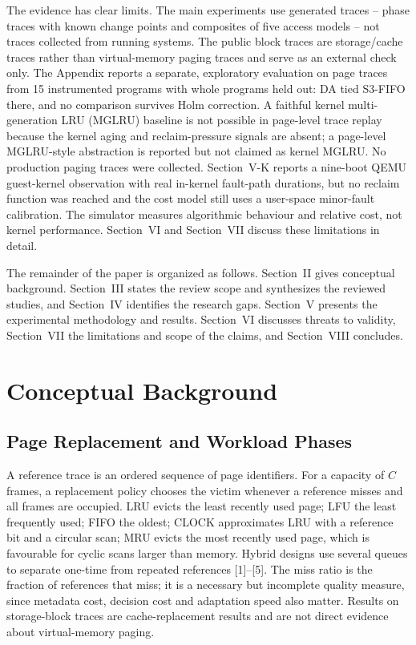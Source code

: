 \documentclass[10pt,twocolumn,a4paper]{IEEEtran}
\begin{document}
The evidence has clear limits. The main experiments use generated traces --
phase traces with known change points and composites of five access models --
not traces collected from running systems. The public block traces are
storage/cache traces rather than virtual-memory paging traces and serve as an
external check only. The Appendix reports a separate, exploratory evaluation
on page traces from 15 instrumented programs with whole programs held out: DA
tied S3-FIFO there, and no comparison survives Holm correction. A faithful
kernel multi-generation LRU (MGLRU) baseline is not possible in page-level
trace replay because the kernel aging and reclaim-pressure signals are absent;
a page-level MGLRU-style abstraction is reported but not claimed as kernel
MGLRU. No production paging traces were collected. Section~V-K reports a
nine-boot QEMU guest-kernel observation with real in-kernel fault-path
durations, but no reclaim function was reached and the cost model still uses a
user-space minor-fault calibration. The simulator measures algorithmic
behaviour and relative cost, not kernel performance. Section~VI and
Section~VII discuss these limitations in detail.

The remainder of the paper is organized as follows. Section~II gives
conceptual background. Section~III states the review scope and synthesizes the
reviewed studies, and Section~IV identifies the research gaps. Section~V
presents the experimental methodology and results. Section~VI discusses
threats to validity, Section~VII the limitations and scope of the claims, and
Section~VIII concludes.

\section{Conceptual Background}
\label{sec:background}

\subsection{Page Replacement and Workload Phases}

A reference trace is an ordered sequence of page identifiers. For a capacity of
$C$ frames, a replacement policy chooses the victim whenever a reference misses
and all frames are occupied. LRU evicts the least recently used page; LFU the
least frequently used; FIFO the oldest; CLOCK approximates LRU with a reference
bit and a circular scan; MRU evicts the most recently used page, which is
favourable for cyclic scans larger than memory. Hybrid designs use several
queues to separate one-time from repeated references [1]--[5]. The miss ratio
is the fraction of references that miss; it is a necessary but incomplete
quality measure, since metadata cost, decision cost and adaptation speed also
matter. Results on storage-block traces are cache-replacement results and are
not direct evidence about virtual-memory paging.
\end{document}

